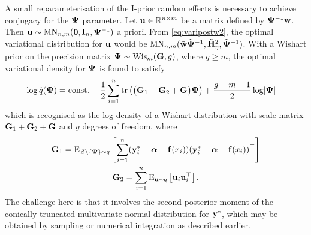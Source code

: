 A small reparameterisation of the I-prior random effects is necessary to achieve conjugacy for the ${\bm\Psi}$ parameter. 
Let ${\mathbf u}\in\mathbb{R}^{n\times m}$ be a matrix defined by ${\bm\Psi}^{-1}{\mathbf w}$.
Then ${\mathbf u} \sim \operatorname{MN}_{n,m}({\mathbf 0}, {\mathbf I}_n, {\bm\Psi}^{-1})$ a priori.
From \cref{eq:varipostw2}, the optimal variational distribution for ${\mathbf u}$ would be $\operatorname{MN}_{n,m}(\tilde{{\mathbf w}}\tilde{{\bm\Psi}}^{-1}, \tilde{{\mathbf H}}_\eta^2, \tilde{{\bm\Psi}}^{-1})$.
With a Wishart prior on the precision matrix ${\bm\Psi}\sim\operatorname{Wis}_m({\mathbf G},g)$, where $g\geq m$, the optimal variational density for ${\bm\Psi}$ is found to satisfy
\begin{align*}
  \log \tilde q({\bm\Psi})
  &= \text{const.}\hspace{0.01em} - \frac{1}{2} \sum_{i=1}^n \operatorname{tr} \left( 
  \big({\mathbf G}_1 + {\mathbf G}_2 + {\mathbf G} \big){\bm\Psi} 
  \right) + \frac{g-m-1}{2} \log \lvert{\bm\Psi}\rvert
\end{align*}
which is recognised as the log density of a Wishart distribution with scale matrix ${\mathbf G}_1 + {\mathbf G}_2 + {\mathbf G}$ and $g$ degrees of freedom, where
\begin{align}
  \begin{gathered}
  {\mathbf G}_1 = \operatorname{E}_{{\mathcal Z}\backslash\{{\bm\Psi}\}\sim q} \left[ 
  \sum_{i=1}^n 
  ({\mathbf y}^*_i - {\bm\alpha} - {\mathbf f}(x_i))
  ({\mathbf y}^*_i - {\bm\alpha} - {\mathbf f}(x_i))^\top 
  \right]   \\
  {\mathbf G}_2 = \sum_{i=1}^n \operatorname{E}_{{\mathbf u}\sim q}\left[{\mathbf u}_i{\mathbf u}_i^\top \right].
  \end{gathered}
\end{align}
The challenge here is that it involves the second posterior moment of the conically truncated multivariate normal distribution for ${\mathbf y}^*$, which may be obtained by sampling or numerical integration as described earlier.

